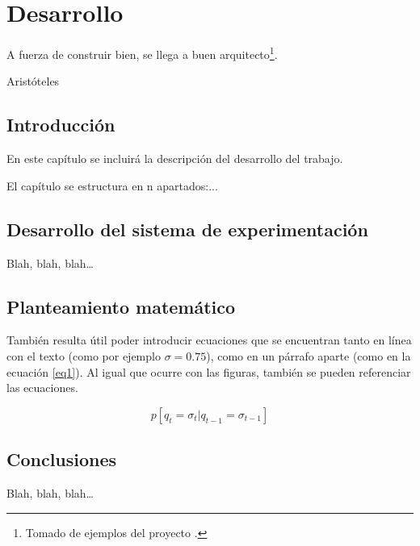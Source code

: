 
\chapter{Desarrollo}
\label{cha:desarrollo}


\begin{FraseCelebre}
  \begin{Frase}
    A fuerza de construir bien, se llega a buen
    arquitecto\footnote{Tomado de ejemplos del proyecto \texis{}.}.
  \end{Frase}
  \begin{Fuente}
    Aristóteles
  \end{Fuente}
\end{FraseCelebre}

\section{Introducción}
\label{sec:introduccion-desarrollo}

En este capítulo se incluirá la descripción del desarrollo del trabajo.

El capítulo se estructura en n apartados:...


\section{Desarrollo del sistema de experimentación}
\label{sec:desarr-del-sist}

Blah, blah, blah\ldots


\section{Planteamiento matemático}
\label{sec:libr-desarr}

También resulta útil poder introducir ecuaciones que se encuentran tanto
en línea con el texto (como por ejemplo $\sigma=0.75$), como en un
párrafo aparte (como en la ecuación \ref{eq1}). Al igual que ocurre con
las figuras, también se pueden referenciar las ecuaciones.

\begin{equation}
  \label{eq1}
  p[q_t=\sigma_t|q_{t-1}=\sigma_{t-1}]
\end{equation}

\section{Conclusiones}
\label{sec:conclusiones-desarrollo}

Blah, blah, blah\ldots



